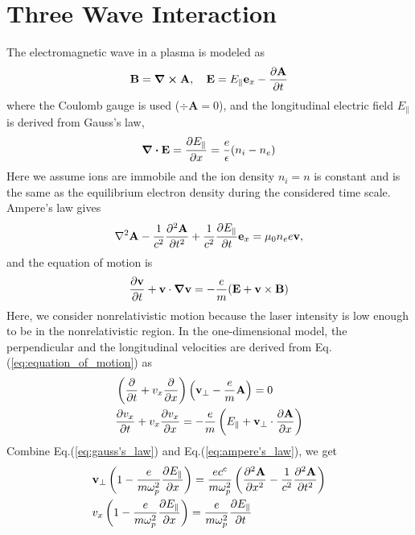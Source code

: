 \documentclass{article}
\begin{document}
    \section{Three Wave Interaction}
    The electromagnetic wave in a plasma is modeled as
    \begin{equation}
        \mathbf{B} = \curl{\mathbf{A}}, \quad
        \mathbf{E} = E_{\parallel}\mathbf{e}_x - \pdv{\mathbf{A}}{t}
    \end{equation}
    where the Coulomb gauge is used ($\div{\mathbf{A}} = 0$), and the longitudinal electric field $E_{\parallel}$ is derived from Gauss's law,
    \begin{equation} \label{eq:gauss's_law}
        \div{\mathbf{E}} = \pdv{E_{\parallel}}{x} = \frac{e}{\epsilon}(n_i - n_e)
    \end{equation}
    Here we assume ions are immobile and the ion density $n_i=n$ is constant and is the same as the equilibrium electron density during the considered time scale.
    Ampere's law gives
    \begin{equation} \label{eq:ampere's_law}
        \laplacian{\mathbf{A}} - \frac{1}{c^2}\pdv[2]{\mathbf{A}}{t} + \frac{1}{c^2}\pdv{E_{\parallel}}{t}\mathbf{e}_x = \mu_0n_ee\mathbf{v},
    \end{equation}
    and the equation of motion is 
    \begin{equation} \label{eq:equation_of_motion}
        \pdv{\mathbf{v}}{t} + \mathbf{v}\cdot\grad \mathbf{v} = -\frac{e}{m}(\mathbf{E + v\times B})
    \end{equation}
    Here, we consider nonrelativistic motion because the laser intensity is low enough to be in the nonrelativistic region. In the one-dimensional model, the perpendicular and the longitudinal velocities are derived from Eq.(\ref{eq:equation_of_motion}) as
    \begin{align}
        &\left( \pdv{t} + v_x\pdv{x} \right)\left( \mathbf{v}_{\perp} - \frac{e}{m}\mathbf{A} \right) = 0 \label{eq:v_perp}\\
        &\pdv{v_x}{t} + v_x\pdv{v_x}{x} = - \frac{e}{m} \left( E_{\parallel} + \mathbf{v}_{\perp}\cdot\pdv{\mathbf{A}}{x} \right)
    \end{align}
    Combine Eq.(\ref{eq:gauss's_law}) and Eq.(\ref{eq:ampere's_law}), we get
    \begin{align}
        &\mathbf{v}_{\perp}\left( 1 - \frac{e}{m\omega_p^2}\pdv{E_{\parallel}}{x} \right) = \frac{ec^c}{m\omega_p^2}\left( \pdv[2]{\mathbf{A}}{x} - \frac{1}{c^2}\pdv[2]{\mathbf{A}}{t} \right) \\
        &v_x\left( 1 - \frac{e}{m\omega_p^2}\pdv{E_{\parallel}}{x} \right) = \frac{e}{m\omega_p^2} \pdv{E_{\parallel}}{t}
    \end{align}
\end{document}
